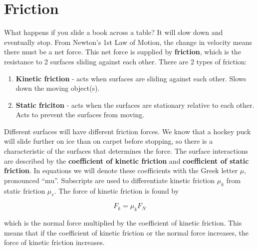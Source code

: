 \documentclass[12pt]{book}
\begin{document}
\section{Friction}

What happens if you slide a book across a table? It will slow down and eventually stop. From Newton's 1st Law of Motion, the change in velocity means there must be a net force. This net force is supplied by \textbf{friction}, which is the resistance to 2 surfaces sliding against each other. There are 2 types of friction:

\begin{enumerate}
\item \textbf{Kinetic friction} - acts when surfaces are sliding against each other. Slows down the moving object(s).

\item \textbf{Static friciton} - acts when the surfaces are stationary relative to each other. Acts to prevent the surfaces from moving.
\end{enumerate}

Different surfaces will have different friction forces. We know that a hockey puck will slide further on ice than on carpet before stopping, so there is a characteristic of the surfaces that determines the force. The surface interactions are described by the \textbf{coefficient of kinetic friction} and \textbf{coefficient of static friction}. In equations we will denote these coefficients with the Greek letter $\mu$, pronounced ``mu''. Subscripts are used to differentiate kinetic friction $\mu_k$ from static friction $\mu_s$. The force of kinetic friction is found by

\begin{equation}
F_k = \mu_k F_N
\label{kfriction}
\end{equation}

which is the normal force multiplied by the coefficient of kinetic friction. This means that if the coefficient of kinetic friction or the normal force increases, the force of kinetic friction increases.
\end{document}

